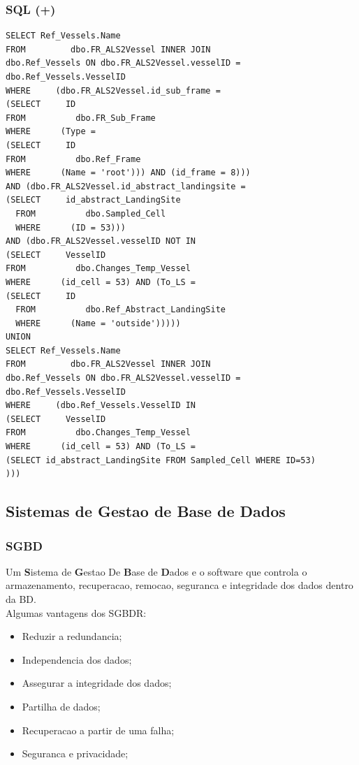 \documentclass[hyperref={pdfpagelabels=true}]{beamer}
\begin{document}
\begin{frame}[fragile]
\frametitle{SQL (+)}
\lstset{language=SQL}
\tiny{
\begin{lstlisting}
SELECT Ref_Vessels.Name	
FROM         dbo.FR_ALS2Vessel INNER JOIN
dbo.Ref_Vessels ON dbo.FR_ALS2Vessel.vesselID = dbo.Ref_Vessels.VesselID
WHERE     (dbo.FR_ALS2Vessel.id_sub_frame =
(SELECT     ID
FROM          dbo.FR_Sub_Frame
WHERE      (Type =
(SELECT     ID
FROM          dbo.Ref_Frame
WHERE      (Name = 'root'))) AND (id_frame = 8)))
AND (dbo.FR_ALS2Vessel.id_abstract_landingsite =
(SELECT     id_abstract_LandingSite
  FROM          dbo.Sampled_Cell
  WHERE      (ID = 53)))
AND (dbo.FR_ALS2Vessel.vesselID NOT IN
(SELECT     VesselID
FROM          dbo.Changes_Temp_Vessel
WHERE      (id_cell = 53) AND (To_LS =
(SELECT     ID
  FROM          dbo.Ref_Abstract_LandingSite
  WHERE      (Name = 'outside')))))
UNION
SELECT Ref_Vessels.Name	
FROM         dbo.FR_ALS2Vessel INNER JOIN
dbo.Ref_Vessels ON dbo.FR_ALS2Vessel.vesselID = dbo.Ref_Vessels.VesselID
WHERE     (dbo.Ref_Vessels.VesselID IN
(SELECT     VesselID
FROM          dbo.Changes_Temp_Vessel
WHERE      (id_cell = 53) AND (To_LS = 
(SELECT id_abstract_LandingSite FROM Sampled_Cell WHERE ID=53)							
)))
\end{lstlisting}
}
\end{frame}

\subsection{Sistemas de Gestao de Base de Dados}
\begin{frame}
\frametitle{SGBD}
Um \textbf{S}istema de \textbf{G}estao De \textbf{B}ase de \textbf{D}ados e o software que controla o armazenamento,
recuperacao, remocao, seguranca e integridade dos dados dentro da BD.\\
Algumas vantagens dos SGBDR:
\begin{itemize}
\item<2-> Reduzir a redundancia;%
\item<3-> Independencia dos dados;%
\item<4-> Assegurar a integridade dos dados;%
\item<5-> Partilha de dados;%
\item<7-> Recuperacao a partir de uma falha;%
\item<8-> Seguranca e privacidade;%
\end{itemize}
\end{frame}
\end{document}
